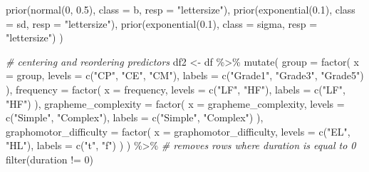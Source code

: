 \documentclass[
  11pt,
  english,
  ,doc,mask,floatsintext]{apa6}
\newenvironment{Shaded}{}{}
\newcommand{\AttributeTok}[1]{\textcolor[rgb]{0.49,0.56,0.16}{#1}}
\newcommand{\CommentTok}[1]{\textcolor[rgb]{0.38,0.63,0.69}{\textit{#1}}}
\newcommand{\DecValTok}[1]{\textcolor[rgb]{0.25,0.63,0.44}{#1}}
\newcommand{\FloatTok}[1]{\textcolor[rgb]{0.25,0.63,0.44}{#1}}
\newcommand{\FunctionTok}[1]{\textcolor[rgb]{0.02,0.16,0.49}{#1}}
\newcommand{\NormalTok}[1]{#1}
\newcommand{\OtherTok}[1]{\textcolor[rgb]{0.00,0.44,0.13}{#1}}
\newcommand{\SpecialCharTok}[1]{\textcolor[rgb]{0.25,0.44,0.63}{#1}}
\newcommand{\StringTok}[1]{\textcolor[rgb]{0.25,0.44,0.63}{#1}}
\begin{document}
\begin{Shaded}
\begin{Highlighting}[]
    \FunctionTok{prior}\NormalTok{(}\FunctionTok{normal}\NormalTok{(}\DecValTok{0}\NormalTok{, }\FloatTok{0.5}\NormalTok{), }\AttributeTok{class =}\NormalTok{ b, }\AttributeTok{resp =} \StringTok{"lettersize"}\NormalTok{),}
    \FunctionTok{prior}\NormalTok{(}\FunctionTok{exponential}\NormalTok{(}\FloatTok{0.1}\NormalTok{), }\AttributeTok{class =}\NormalTok{ sd, }\AttributeTok{resp =} \StringTok{"lettersize"}\NormalTok{),}
    \FunctionTok{prior}\NormalTok{(}\FunctionTok{exponential}\NormalTok{(}\FloatTok{0.1}\NormalTok{), }\AttributeTok{class =}\NormalTok{ sigma, }\AttributeTok{resp =} \StringTok{"lettersize"}\NormalTok{)}
\NormalTok{    )}
\end{Highlighting}
\end{Shaded}

\begin{Shaded}
\begin{Highlighting}[]
\CommentTok{\# centering and reordering predictors}
\NormalTok{df2 }\OtherTok{\textless{}{-}}\NormalTok{ df }\SpecialCharTok{\%\textgreater{}\%}
    \FunctionTok{mutate}\NormalTok{(}
        \AttributeTok{group =} \FunctionTok{factor}\NormalTok{(}
            \AttributeTok{x =}\NormalTok{ group,}
            \AttributeTok{levels =} \FunctionTok{c}\NormalTok{(}\StringTok{"CP"}\NormalTok{, }\StringTok{"CE"}\NormalTok{, }\StringTok{"CM"}\NormalTok{),}
            \AttributeTok{labels =} \FunctionTok{c}\NormalTok{(}\StringTok{"Grade1"}\NormalTok{, }\StringTok{"Grade3"}\NormalTok{, }\StringTok{"Grade5"}\NormalTok{)}
\NormalTok{            ),}
        \AttributeTok{frequency =} \FunctionTok{factor}\NormalTok{(}
            \AttributeTok{x =}\NormalTok{ frequency,}
            \AttributeTok{levels =} \FunctionTok{c}\NormalTok{(}\StringTok{"LF"}\NormalTok{, }\StringTok{"HF"}\NormalTok{),}
            \AttributeTok{labels =} \FunctionTok{c}\NormalTok{(}\StringTok{"LF"}\NormalTok{, }\StringTok{"HF"}\NormalTok{)}
\NormalTok{            ),}
        \AttributeTok{grapheme\_complexity =} \FunctionTok{factor}\NormalTok{(}
            \AttributeTok{x =}\NormalTok{ grapheme\_complexity,}
            \AttributeTok{levels =} \FunctionTok{c}\NormalTok{(}\StringTok{"Simple"}\NormalTok{, }\StringTok{"Complex"}\NormalTok{),}
            \AttributeTok{labels =} \FunctionTok{c}\NormalTok{(}\StringTok{"Simple"}\NormalTok{, }\StringTok{"Complex"}\NormalTok{)}
\NormalTok{            ),}
        \AttributeTok{graphomotor\_difficulty =} \FunctionTok{factor}\NormalTok{(}
            \AttributeTok{x =}\NormalTok{ graphomotor\_difficulty,}
            \AttributeTok{levels =} \FunctionTok{c}\NormalTok{(}\StringTok{"EL"}\NormalTok{, }\StringTok{"HL"}\NormalTok{),}
            \AttributeTok{labels =} \FunctionTok{c}\NormalTok{(}\StringTok{"t"}\NormalTok{, }\StringTok{"f"}\NormalTok{)}
\NormalTok{            )}
\NormalTok{        ) }\SpecialCharTok{\%\textgreater{}\%}
    \CommentTok{\# removes rows where duration is equal to 0}
    \FunctionTok{filter}\NormalTok{(duration }\SpecialCharTok{!=} \DecValTok{0}\NormalTok{)}


\end{Highlighting}
\end{Shaded}
\end{document}
